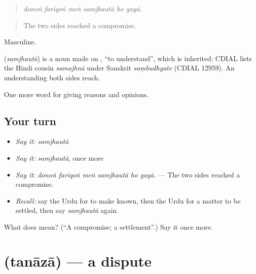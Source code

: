 \begin{quote}
     
\end{quote}

\begin{quote}
\emph{donoṅ farīqoṅ meṅ samjhautā ho gayā.}
\end{quote}

\begin{quote}
The two sides reached a compromise.
\end{quote}

Masculine.

\begin{cousinweb}
\textbf{} (\emph{samjhautā}) is a noun made on \textbf{}, \textquotedblleft{}to understand\textquotedblright{}, which is inherited: CDIAL lists the Hindi cousin \emph{samajhnā} under Sanskrit \emph{saṃbudhyate} (CDIAL 12959). An understanding both sides reach.
\end{cousinweb}

\begin{grammarlens}[title={What you've built}]
One more word for giving reasons and opinions.
\end{grammarlens}

\subsection*{Your turn}
\begin{itemize}
\raggedright
  \item \emph{Say it:} \emph{samjhautā}
  \item \emph{Say it:} \emph{samjhautā}, once more
  \item \emph{Say it:} \emph{donoṅ farīqoṅ meṅ samjhautā ho gayā.} — The two sides reached a compromise.
  \item \emph{Recall:} say the Urdu for to make known, then the Urdu for a matter to be settled, then say \emph{samjhautā} again
\end{itemize}

\begin{tcolorbox}[breakable,colback=teal!4,colframe=teal!35!black,title={Before you move on}]
What does  mean? (\textquotedblleft{}A compromise; a settlement\textquotedblright{}.) Say it once more.
\end{tcolorbox}
\section[\texorpdfstring{\ur{تنازعہ} (tanāzā)}{تنازعہ (tanāzā)}]{ (tanāzā) — a dispute}

